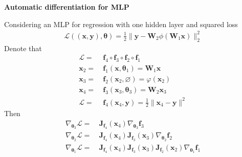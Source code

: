\begin{example}
    \textbf{Automatic differentiation for MLP}
    
    Considering an MLP for regression with one hidden layer and squared loss
    \begin{gather}
        \mathcal{L}((\bm{x},\bm{y}),\bm{\theta}) 
        = \frac{1}{2}\|\bm{y}-\mathbf{W}_2\phi(\mathbf{W}_1\bm{x})\|_2^2
    \end{gather}
    Denote that
    \begin{align}
        \mathcal{L} =&~ \bm{f}_4\circ\bm{f}_3\circ\bm{f}_2\circ\bm{f}_1 \\
        \bm{x}_2 =&~ \bm{f}_1(\bm{x},\bm{\theta}_1) = \mathbf{W}_1\bm{x} \\
        \bm{x}_3 =&~ \bm{f}_2(\bm{x}_2,\varnothing) = \varphi(\bm{x}_2) \\
        \bm{x}_4 =&~ \bm{f}_3(\bm{x}_3,\bm{\theta}_3) = \mathbf{W}_2\bm{x}_3 \\
        \mathcal{L} =&~ \bm{f}_4(\bm{x}_4,\bm{y}) = \frac{1}{2}\|\bm{x}_4-\bm{y}\|^2
    \end{align}
    Then
    \begin{align}
        \nabla_{\bm{\theta}_3}\mathcal{L} 
        =&~ \mathbf{J}_{\bm{f}_4}(\bm{x}_4)
            \nabla_{\bm{\theta}_3}\bm{f}_3\\
        \nabla_{\bm{\theta}_2}\mathcal{L}
        =&~ \mathbf{J}_{\bm{f}_4}(\bm{x}_4)
            \mathbf{J}_{\bm{f}_3}(\bm{x}_3)
            \nabla_{\bm{\theta}_2}\bm{f}_2\\
        \nabla_{\bm{\theta}_1}\mathcal{L}
        =&~ \mathbf{J}_{\bm{f}_4}(\bm{x}_4)
            \mathbf{J}_{\bm{f}_3}(\bm{x}_3)
            \mathbf{J}_{\bm{f}_2}(\bm{x}_2)
            \nabla_{\bm{\theta}_1}\bm{f}_1
    \end{align}
\end{example}


